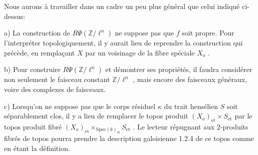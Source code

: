Nous aurons à travailler dans un cadre un peu plus général que celui indiqué ci-dessus:

a)  La construction de $R \Psi( \mathbb{Z} /\ell^n)$ ne suppose pas que $f$ soit propre. Pour l'interpréter topologiquement, il y aurait lieu de reprendre la construction qui précède, en remplaçant $X$ par un voisinage de la fibre spéciale $X_o$ .

b)  Pour construire $R \Psi(\mathbb{Z}/\ell^n)$ et démontrer ses propriétés, il faudra considérer non seulement le faisceau constant $\mathbb{Z}/\ell^n$ , mais encore des faisceaux généraux, voire des complexes de faisceaux.

c)  Lorsqu'on ne suppose pas que le corps résiduel $\kappa$ du trait hensélien $S$ soit séparablement clos, il y a lieu de remplacer le topos produit $(X_o)_{\mathrm{et}} \times S_{\mathrm{et}}$ par le topos produit fibré $(X_o)_{\mathrm{et}} \times_{\mathrm{Spec}(k)_{\mathrm{et}}} S_{\mathrm{et}}$ . Le lecteur répugnant aux 2-produits fibrés de topos pourra prendre la description galoisienne 1.2.4 de ce topos comme en étant la définition.
